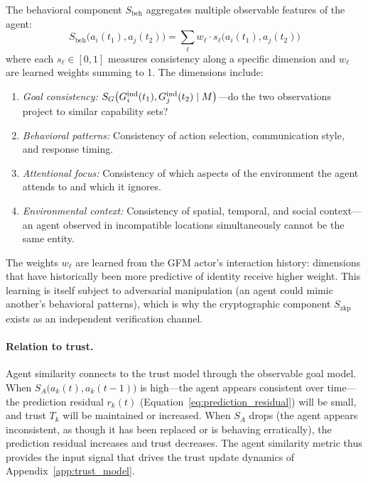The behavioral component $S_{\mathrm{beh}}$ aggregates multiple observable features of the agent:
\begin{equation}
\label{eq:behavioral_similarity}
S_{\mathrm{beh}}\bigl(a_i(t_1), a_j(t_2)\bigr) = \sum_{\ell} w_\ell \cdot s_\ell\bigl(a_i(t_1), a_j(t_2)\bigr)
\end{equation}
where each $s_\ell \in [0, 1]$ measures consistency along a specific dimension and $w_\ell$ are learned weights summing to 1. The dimensions include:
\begin{enumerate}
\item \emph{Goal consistency:} $S_G\bigl(G_{i}^{\mathrm{ind}}(t_1), G_{j}^{\mathrm{ind}}(t_2) \mid M\bigr)$---do the two observations project to similar capability sets?
\item \emph{Behavioral patterns:} Consistency of action selection, communication style, and response timing.
\item \emph{Attentional focus:} Consistency of which aspects of the environment the agent attends to and which it ignores.
\item \emph{Environmental context:} Consistency of spatial, temporal, and social context---an agent observed in incompatible locations simultaneously cannot be the same entity.
\end{enumerate}

The weights $w_\ell$ are learned from the GFM actor's interaction history: dimensions that have historically been more predictive of identity receive higher weight. This learning is itself subject to adversarial manipulation (an agent could mimic another's behavioral patterns), which is why the cryptographic component $S_{\mathrm{zkp}}$ exists as an independent verification channel.

\paragraph{Relation to trust.} Agent similarity connects to the trust model through the observable goal model. When $S_A\bigl(a_k(t), a_k(t-1)\bigr)$ is high---the agent appears consistent over time---the prediction residual $r_k(t)$ (Equation~\ref{eq:prediction_residual}) will be small, and trust $T_k$ will be maintained or increased. When $S_A$ drops (the agent appears inconsistent, as though it has been replaced or is behaving erratically), the prediction residual increases and trust decreases. The agent similarity metric thus provides the input signal that drives the trust update dynamics of Appendix~\ref{app:trust_model}.

